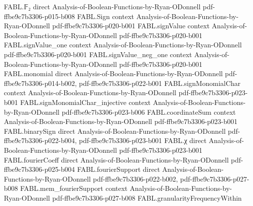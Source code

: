 \begin{theorem}
\label{FABL.BooleanCircuit.acceptedProperty_of_toWidthThreeCNF_eval}
\leanok
{}
\proofstep
  {FABL.𝔽₂}
  {direct}
  {Analysis-of-Boolean-Functions-by-Ryan-ODonnell}
  {pdf-ffbe9c7b3306-p015-b008}
\proofstep
  {FABL.Sign}
  {context}
  {Analysis-of-Boolean-Functions-by-Ryan-ODonnell}
  {pdf-ffbe9c7b3306-p020-b001}
\proofstep
  {FABL.signValue}
  {context}
  {Analysis-of-Boolean-Functions-by-Ryan-ODonnell}
  {pdf-ffbe9c7b3306-p020-b001}
\proofstep
  {FABL.signValue_one}
  {context}
  {Analysis-of-Boolean-Functions-by-Ryan-ODonnell}
  {pdf-ffbe9c7b3306-p020-b001}
\proofstep
  {FABL.signValue_neg_one}
  {context}
  {Analysis-of-Boolean-Functions-by-Ryan-ODonnell}
  {pdf-ffbe9c7b3306-p020-b001}
\proofstep
  {FABL.monomial}
  {direct}
  {Analysis-of-Boolean-Functions-by-Ryan-ODonnell}
  {pdf-ffbe9c7b3306-p014-b002,
    pdf-ffbe9c7b3306-p022-b001}
\proofstep
  {FABL.signMonomialChar}
  {context}
  {Analysis-of-Boolean-Functions-by-Ryan-ODonnell}
  {pdf-ffbe9c7b3306-p023-b001}
\proofstep
  {FABL.signMonomialChar_injective}
  {context}
  {Analysis-of-Boolean-Functions-by-Ryan-ODonnell}
  {pdf-ffbe9c7b3306-p023-b006}
\proofstep
  {FABL.coordinateSum}
  {context}
  {Analysis-of-Boolean-Functions-by-Ryan-ODonnell}
  {pdf-ffbe9c7b3306-p023-b001}
\proofstep
  {FABL.binarySign}
  {direct}
  {Analysis-of-Boolean-Functions-by-Ryan-ODonnell}
  {pdf-ffbe9c7b3306-p022-b004,
    pdf-ffbe9c7b3306-p023-b001}
\proofstep
  {FABL.χ}
  {direct}
  {Analysis-of-Boolean-Functions-by-Ryan-ODonnell}
  {pdf-ffbe9c7b3306-p023-b001}
\proofstep
  {FABL.fourierCoeff}
  {direct}
  {Analysis-of-Boolean-Functions-by-Ryan-ODonnell}
  {pdf-ffbe9c7b3306-p025-b004}
\proofstep
  {FABL.fourierSupport}
  {direct}
  {Analysis-of-Boolean-Functions-by-Ryan-ODonnell}
  {pdf-ffbe9c7b3306-p022-b002,
    pdf-ffbe9c7b3306-p027-b008}
\proofstep
  {FABL.mem_fourierSupport}
  {context}
  {Analysis-of-Boolean-Functions-by-Ryan-ODonnell}
  {pdf-ffbe9c7b3306-p027-b008}
\proofstep
  {FABL.granularityFrequencyWithin}

\end{theorem}
